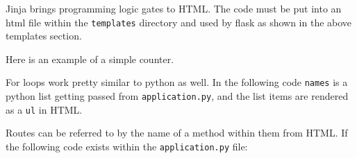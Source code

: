 \documentclass[]{book}
\newenvironment{Shaded}{\begin{snugshade}}{\end{snugshade}}
\newcommand{\KeywordTok}[1]{\textcolor[rgb]{0.13,0.29,0.53}{\textbf{#1}}}
\newcommand{\OperatorTok}[1]{\textcolor[rgb]{0.81,0.36,0.00}{\textbf{#1}}}
\newcommand{\ExtensionTok}[1]{#1}
\newcommand{\NormalTok}[1]{#1}
\begin{document}
Jinja brings programming logic gates to HTML. The code must be put into
an html file within the \texttt{templates} directory and used by flask
as shown in the above templates section.

\begin{Shaded}
\end{Shaded}

Here is an example of a simple counter.

\begin{Shaded}
\end{Shaded}

For loops work pretty similar to python as well. In the following code
\texttt{names} is a python list getting passed from
\texttt{application.py}, and the list items are rendered as a
\texttt{ul} in HTML.

\begin{Shaded}
\end{Shaded}

Routes can be referred to by the name of a method within them from HTML.
If the following code exists within the \texttt{application.py} file:
\end{document}
